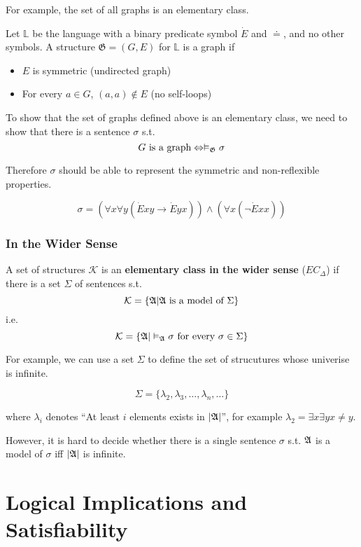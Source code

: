 For example, the set of all graphs is an elementary class.

Let $\mathbb{L}$ be the language with a binary predicate symbol $\dot{E}$ and $\doteq$, and no other symbols. A structure $\mathfrak{G} = (G, E)$ for $\mathbb{L}$ is a graph if
\begin{itemize}
    \item $E$ is symmetric (undirected graph)
    \item For every $a \in G$, $(a, a) \notin E$ (no self-loops)
\end{itemize}

To show that the set of graphs defined above is an elementary class, we need to show that there is a sentence $\sigma$ s.t.
\[ \text{$G$ is a graph} \Leftrightarrow \vDash_{\mathfrak{G}}\sigma \]

Therefore $\sigma$ should be able to represent the symmetric and non-reflexible properties.

\[\sigma = (\forall x \forall y (\dot{E}xy \to \dot{E}yx)) \wedge (\forall x(\neg \dot{E}xx))\]

\subsubsection{In the Wider Sense}

\begin{definition}
    A set of structures $\mathcal{K}$ is an \textbf{elementary class in the wider sense} ($EC_\Delta$) if there is a set $\Sigma$ of sentences s.t.
    \[ \mathcal{K} = \{ \mathfrak{A} | \mathfrak{A} \text{ is a model of } \Sigma \} \]
    i.e.
    \[ \mathcal{K} = \{ \mathfrak{A} | \vDash_{\mathfrak{A}}\sigma \text{ for every $\sigma \in \Sigma$} \} \]
\end{definition}

For example, we can use a set $\Sigma$ to define the set of strucutures whose univerise is infinite.

\[ \Sigma = \{ \lambda_2, \lambda_3, \dots, \lambda_n, \dots \} \]

where $\lambda_i$ denotes ``At least $i$ elements exists in $|\mathfrak{A}|$'', for example $\lambda_2 = \exists x \exists y x \neq y$.

However, it is hard to decide whether there is a single sentence $\sigma$ s.t. $\mathfrak{A}$ is a model of $\sigma$ iff $|\mathfrak{A}|$ is infinite.

\section{Logical Implications and Satisfiability}

